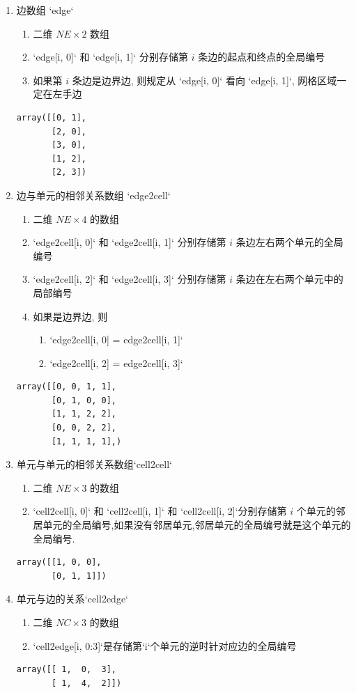 \documentclass{article}
\begin{document}
\begin{enumerate}
\item 边数组 `edge`
\begin{enumerate}
    \item 二维 $NE\times 2$ 数组 
    \item `edge[i, 0]` 和 `edge[i, 1]` 分别存储第 $i$ 条边的起点和终点的全局编号
    \item 如果第 $i$ 条边是边界边, 则规定从 `edge[i, 0]` 看向 `edge[i, 1]`, 网格区域一定在左手边
\end{enumerate}
\begin{lstlisting}
array([[0, 1],
       [2, 0],
       [3, 0],
       [1, 2],
       [2, 3])
\end{lstlisting}
\item 边与单元的相邻关系数组 `edge2cell`
\begin{enumerate}
    \item 二维 $NE \times 4 $ 的数组
    \item `edge2cell[i, 0]` 和 `edge2cell[i, 1]` 分别存储第 $i$ 条边左右两个单元的全局编号
\newpage
    \item `edge2cell[i, 2]` 和 `edge2cell[i, 3]` 分别存储第 $i$ 条边在左右两个单元中的局部编号
    \item 如果是边界边, 则
\begin{enumerate}
        \item `edge2cell[i, 0] = edge2cell[i, 1]` 
        \item `edge2cell[i, 2] = edge2cell[i, 3]`
\end{enumerate}
\end{enumerate}
\begin{lstlisting}
array([[0, 0, 1, 1],
       [0, 1, 0, 0],
       [1, 1, 2, 2],
       [0, 0, 2, 2],
       [1, 1, 1, 1],)
\end{lstlisting}
\item 单元与单元的相邻关系数组`cell2cell`
\begin{enumerate}
  \item 二维 $NE \times 3$ 的数组
  \item `cell2cell[i, 0]` 和 `cell2cell[i, 1]` 和 `cell2cell[i, 2]`分别存储第 $i$ 个单元的邻居单元的全局编号,如果没有邻居单元,邻居单元的全局编号就是这个单元的全局编号.
  
\end{enumerate}
\begin{lstlisting}
array([[1, 0, 0],
       [0, 1, 1]])
\end{lstlisting}
\item 单元与边的关系`cell2edge`
\begin{enumerate}
\item 二维 $NC \times 3$ 的数组
\item `cell2edge[i, 0:3]`是存储第`i`个单元的逆时针对应边的全局编号
\end{enumerate}
\begin{lstlisting}
array([[ 1,  0,  3],
       [ 1,  4,  2]])
\end{lstlisting}
\end{enumerate}
\end{document}
